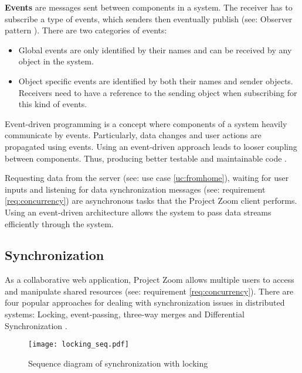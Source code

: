 \textbf{Events} are messages sent between components in a system. The receiver has to subscribe a type of events, which senders then eventually publish (see: Observer pattern \cite{Gamma_1994}). There are two categories of events:
\begin{itemize}
\item Global events are only identified by their names and can be received by any object in the system.
\item Object specific events are identified by both their names and sender objects. Receivers need to have a reference to the sending object when subscribing for this kind of events.
\end{itemize}

Event-driven programming is a concept where components of a system heavily communicate by events. Particularly, data changes and user actions are propagated using events. Using an event-driven approach leads to looser coupling between components. Thus, producing better testable and maintainable code \cite{Faison_2011}.

Requesting data from the server (see: use case \ref{uc:fromhome}), waiting for user inputs and listening for data synchronization messages (see: requirement \ref{req:concurrency}) are asynchronous tasks that the Project Zoom client performs. Using an event-driven architecture allows the system to pass data streams efficiently through the system.


\subsection{Synchronization}
As a collaborative web application, Project Zoom allows multiple users to access and manipulate shared resources (see: requirement \ref{req:concurrency}). There are four popular approaches for dealing with synchronization issues in distributed systems: Locking, event-passing, three-way merges and Differential Synchronization \cite{Fraser_2009}.

\begin{figure}[!h]
\begin{center}
\texttt{[image: locking\_seq.pdf]}
\caption{Sequence diagram of synchronization with locking}
\label{fig:locking}
\end{center}
\end{figure}

